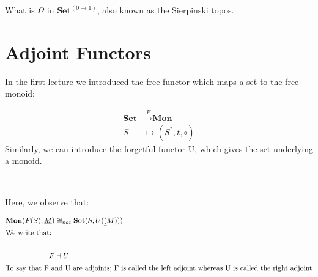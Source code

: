 \begin{exercise}
  What is $\Omega$ in $\textbf{Set}^{(0 \to 1)}$, also known as the 
Sierpinski topos.
\end{exercise}

\section{Adjoint Functors}

\begin{example}
  In the first lecture we introduced the free functor which maps a set to 
the free monoid:

  \begin{align*}
    \textbf{Set} &\overset{F}{\longrightarrow} \textbf{Mon} \\
    S &\longmapsto (S^*, t, \circ)
  \end{align*}
  Similarly, we can introduce the forgetful functor U, which gives the set 
underlying a monoid.

\begin{center}
  \\[1mm]
\end{center}

Here, we observe that:

\begin{align*}
  \textbf{Mon}(F(S), \underline{M}) &\cong_{nat} 
    \textbf{Set}(S, U(\underline(M))) \\
    \shortintertext{We write that:} \\
    F &\dashv U \\
    \intertext{To say that F and U are adjoints; F is called the left adjoint
    whereas U is called the right adjoint}
  \end{align*}
\end{example}

